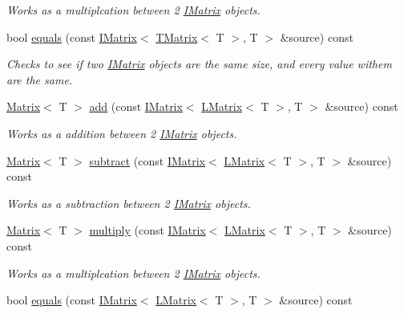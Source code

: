 \begin{DoxyCompactItemize}
\begin{DoxyCompactList}\small\item\em Works as a multiplcation between 2 \mbox{\hyperlink{class_i_matrix}{I\+Matrix}} objects. \end{DoxyCompactList}\item 
bool \mbox{\hyperlink{class_t_matrix_adf09f7a3051afe14137e6abf075cb42e}{equals}} (const \mbox{\hyperlink{class_i_matrix}{I\+Matrix}}$<$ \mbox{\hyperlink{class_t_matrix}{T\+Matrix}}$<$ T $>$, T $>$ \&source) const
\begin{DoxyCompactList}\small\item\em Checks to see if two \mbox{\hyperlink{class_i_matrix}{I\+Matrix}} objects are the same size, and every value withem are the same. \end{DoxyCompactList}\item 
\mbox{\hyperlink{class_matrix}{Matrix}}$<$ T $>$ \mbox{\hyperlink{class_t_matrix_acd10f3284cbf49a0d514354bfa3e30ed}{add}} (const \mbox{\hyperlink{class_i_matrix}{I\+Matrix}}$<$ \mbox{\hyperlink{class_l_matrix}{L\+Matrix}}$<$ T $>$, T $>$ \&source) const
\begin{DoxyCompactList}\small\item\em Works as a addition between 2 \mbox{\hyperlink{class_i_matrix}{I\+Matrix}} objects. \end{DoxyCompactList}\item 
\mbox{\hyperlink{class_matrix}{Matrix}}$<$ T $>$ \mbox{\hyperlink{class_t_matrix_a430b0462e759a99718c2c6a64e1d143d}{subtract}} (const \mbox{\hyperlink{class_i_matrix}{I\+Matrix}}$<$ \mbox{\hyperlink{class_l_matrix}{L\+Matrix}}$<$ T $>$, T $>$ \&source) const
\begin{DoxyCompactList}\small\item\em Works as a subtraction between 2 \mbox{\hyperlink{class_i_matrix}{I\+Matrix}} objects. \end{DoxyCompactList}\item 
\mbox{\hyperlink{class_matrix}{Matrix}}$<$ T $>$ \mbox{\hyperlink{class_t_matrix_a4380f9d0e1e9ecd6d46dcbce83701872}{multiply}} (const \mbox{\hyperlink{class_i_matrix}{I\+Matrix}}$<$ \mbox{\hyperlink{class_l_matrix}{L\+Matrix}}$<$ T $>$, T $>$ \&source) const
\begin{DoxyCompactList}\small\item\em Works as a multiplcation between 2 \mbox{\hyperlink{class_i_matrix}{I\+Matrix}} objects. \end{DoxyCompactList}\item 
bool \mbox{\hyperlink{class_t_matrix_acfda342c2b3e272aacb9137b58a3e906}{equals}} (const \mbox{\hyperlink{class_i_matrix}{I\+Matrix}}$<$ \mbox{\hyperlink{class_l_matrix}{L\+Matrix}}$<$ T $>$, T $>$ \&source) const

\end{DoxyCompactItemize}
